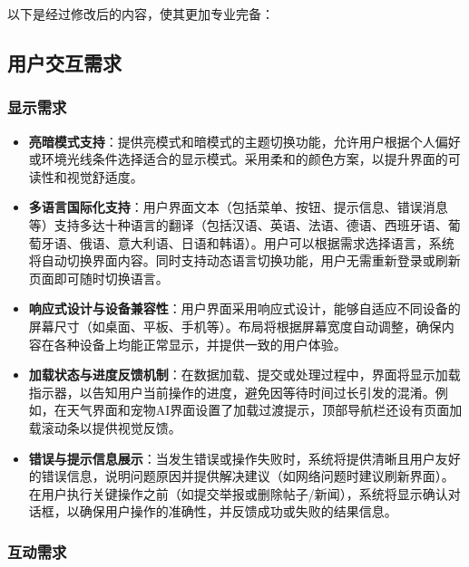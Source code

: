 以下是经过修改后的内容，使其更加专业完备：

\subsection{用户交互需求}

\subsubsection{显示需求}

\begin{itemize}
	\item \textbf{亮暗模式支持}：提供亮模式和暗模式的主题切换功能，允许用户根据个人偏好或环境光线条件选择适合的显示模式。采用柔和的颜色方案，以提升界面的可读性和视觉舒适度。
	\item \textbf{多语言国际化支持}：用户界面文本（包括菜单、按钮、提示信息、错误消息等）支持多达十种语言的翻译（包括汉语、英语、法语、德语、西班牙语、葡萄牙语、俄语、意大利语、日语和韩语）。用户可以根据需求选择语言，系统将自动切换界面内容。同时支持动态语言切换功能，用户无需重新登录或刷新页面即可随时切换语言。
	\item \textbf{响应式设计与设备兼容性}：用户界面采用响应式设计，能够自适应不同设备的屏幕尺寸（如桌面、平板、手机等）。布局将根据屏幕宽度自动调整，确保内容在各种设备上均能正常显示，并提供一致的用户体验。
	\item \textbf{加载状态与进度反馈机制}：在数据加载、提交或处理过程中，界面将显示加载指示器，以告知用户当前操作的进度，避免因等待时间过长引发的混淆。例如，在天气界面和宠物AI界面设置了加载过渡提示，顶部导航栏还设有页面加载滚动条以提供视觉反馈。
	\item \textbf{错误与提示信息展示}：当发生错误或操作失败时，系统将提供清晰且用户友好的错误信息，说明问题原因并提供解决建议（如网络问题时建议刷新界面）。在用户执行关键操作之前（如提交举报或删除帖子/新闻），系统将显示确认对话框，以确保用户操作的准确性，并反馈成功或失败的结果信息。
\end{itemize}

\subsubsection{互动需求}

